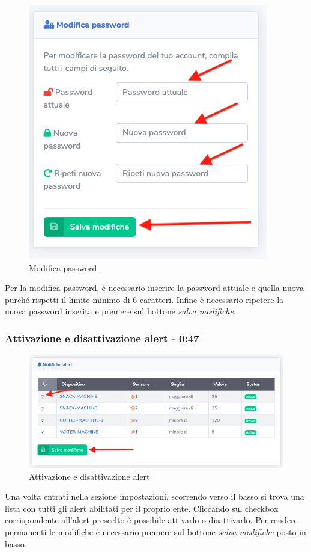 		\begin{figure}[H]
		\centering
		\includegraphics[scale=0.600]{res/images/membro/modPassword.png}
		\caption{Modifica password}
	\end{figure}
	Per la modifica password, è necessario inserire la password attuale e quella nuova purché rispetti il limite minimo di 6 caratteri.
	Infine è necessario ripetere la nuova password inserita e premere sul bottone \textit{salva modifiche}.

	\subsubsection{Attivazione e disattivazione alert - 0:47}

		\begin{figure}[H]
		\centering
		\includegraphics[scale=0.600]{res/images/membro/attDisattAlert.png}
		\caption{Attivazione e disattivazione alert}
	\end{figure}
	Una volta entrati nella sezione impostazioni, scorrendo verso il basso si trova una lista con tutti gli alert abilitati per il proprio ente. Cliccando sul checkbox corrispondente all'alert prescelto è possibile attivarlo o disattivarlo. Per rendere permanenti le modifiche è necessario premere sul bottone \textit{salva modifiche} posto in basso.
	


